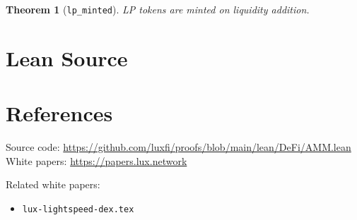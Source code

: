 \documentclass[11pt]{article}
\newtheorem{theorem}{Theorem}
\begin{document}
\begin{theorem}[\texttt{lp\_minted}]
LP tokens are minted on liquidity addition.
\end{theorem}


\section{Lean Source}


\section{References}
\noindent Source code: \url{https://github.com/luxfi/proofs/blob/main/lean/DeFi/AMM.lean}\\
\noindent White papers: \url{https://papers.lux.network}

\noindent Related white papers:
\begin{itemize}
  \item \texttt{lux-lightspeed-dex.tex}
\end{itemize}
\end{document}
